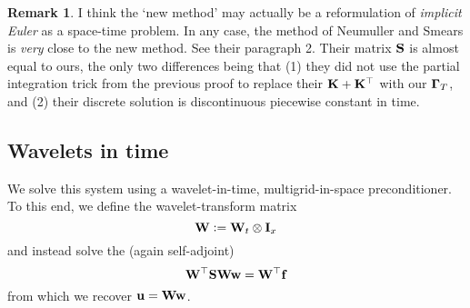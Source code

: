 \documentclass[11pt,a4paper]{amsart}
\theoremstyle{definition}
\newtheorem*{remark}{Remark}
\newcommand{\kron}{\otimes}
\begin{document}
\begin{remark}
  I think the `new method' may actually be a reformulation of \emph{implicit Euler} as a space-time problem. In any case, the method of Neumuller and Smears is \emph{very} close to the new method. See their paragraph 2. Their matrix ${\bf S}$ is almost equal to ours, the only two differences being that (1) they did not use the partial integration trick from the previous proof to replace their ${\bf K} + {\bf K}^\top$ with our ${\bf \Gamma}_T$, and (2) their discrete solution is discontinuous piecewise constant in time.
\end{remark}

\subsection*{Wavelets in time}
We solve this system using a wavelet-in-time, multigrid-in-space preconditioner. To this end, we
define the wavelet-transform matrix
\[
  {\bf W} := {\bf W}_t \kron {\bf I}_x
\]
and instead solve the (again self-adjoint)
\begin{equation}
  {\bf W}^\top {\bf S} {\bf W} {\bf w} = {\bf W}^\top {\bf f}
  \label{eqn:wit-mat}
\end{equation}
from which we recover ${\bf u} = {\bf W} {\bf w}$.
\end{document}
